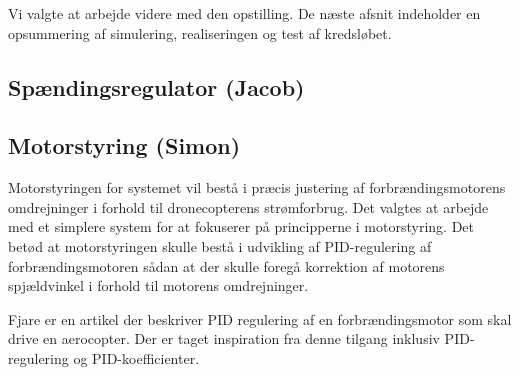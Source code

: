 Vi valgte at arbejde videre med den opstilling. De næste afsnit indeholder en opsummering af simulering, realiseringen og test af kredsløbet.

\subsection{Spændingsregulator (Jacob)}
\label{sec:spandingsforstarker}



\subsection{Motorstyring (Simon)}
\label{sec:motorstyring}


Motorstyringen for systemet vil bestå i præcis justering af forbrændingsmotorens omdrejninger i forhold til dronecopterens strømforbrug. Det valgtes at arbejde med et simplere system for at fokuserer på principperne i motorstyring. Det betød at motorstyringen skulle bestå i udvikling af PID-regulering af forbrændingsmotoren sådan at der skulle foregå korrektion af motorens spjældvinkel i forhold til motorens omdrejninger.

Fjare\autocite{pid1} er en artikel der beskriver PID regulering af en forbrændingsmotor som skal drive en aerocopter. Der er taget inspiration fra denne tilgang inklusiv PID-regulering og PID-koefficienter.




